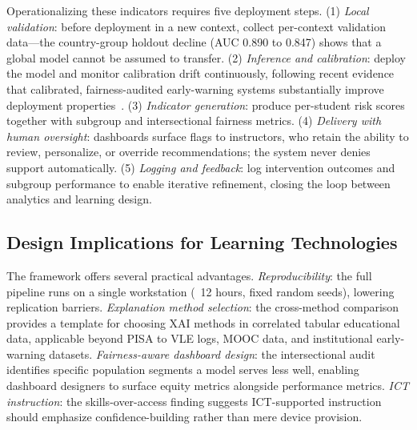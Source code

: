 \documentclass[journal]{IEEEtran}
\begin{document}
Operationalizing these indicators requires five deployment steps. (1) \emph{Local validation}: before deployment in a new context, collect per-context validation data---the country-group holdout decline (AUC 0.890 to 0.847) shows that a global model cannot be assumed to transfer. (2) \emph{Inference and calibration}: deploy the model and monitor calibration drift continuously, following recent evidence that calibrated, fairness-audited early-warning systems substantially improve deployment properties~\cite{wu2026calibrated}. (3) \emph{Indicator generation}: produce per-student risk scores together with subgroup and intersectional fairness metrics. (4) \emph{Delivery with human oversight}: dashboards surface flags to instructors, who retain the ability to review, personalize, or override recommendations; the system never denies support automatically. (5) \emph{Logging and feedback}: log intervention outcomes and subgroup performance to enable iterative refinement, closing the loop between analytics and learning design.

\subsection{Design Implications for Learning Technologies}
The framework offers several practical advantages. \emph{Reproducibility}: the full pipeline runs on a single workstation (~12 hours, fixed random seeds), lowering replication barriers. \emph{Explanation method selection}: the cross-method comparison provides a template for choosing XAI methods in correlated tabular educational data, applicable beyond PISA to VLE logs, MOOC data, and institutional early-warning datasets. \emph{Fairness-aware dashboard design}: the intersectional audit identifies specific population segments a model serves less well, enabling dashboard designers to surface equity metrics alongside performance metrics. \emph{ICT instruction}: the skills-over-access finding suggests ICT-supported instruction should emphasize confidence-building rather than mere device provision.
\end{document}
